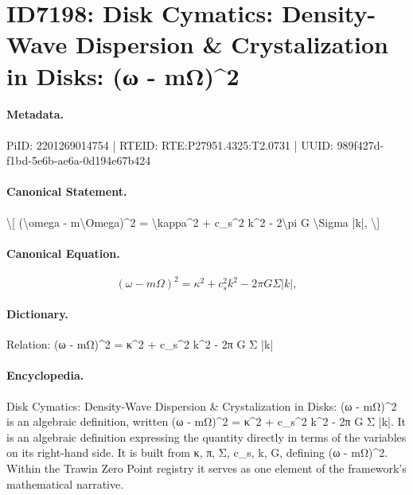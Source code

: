 \section*{ID7198: Disk Cymatics: Density-Wave Dispersion \& Crystalization in Disks: (ω - mΩ)\textasciicircum{}2}
\paragraph{Metadata.}
PiID: 2201269014754 | RTEID: RTE:P27951.4325:T2.0731 | UUID: 989f427d-f1bd-5e6b-ae6a-0d194e67b424

\paragraph{Canonical Statement.}
\textbackslash{}[ (\textbackslash{}omega - m\textbackslash{}Omega)\textasciicircum{}2 = \textbackslash{}kappa\textasciicircum{}2 + c\_s\textasciicircum{}2 k\textasciicircum{}2 - 2\textbackslash{}pi G \textbackslash{}Sigma |k|, \textbackslash{}]

\paragraph{Canonical Equation.}
\[
(\omega - m\Omega)^2 = \kappa^2 + c_s^2 k^2 - 2\pi G \Sigma |k|,
\]

\paragraph{Dictionary.}
Relation: (ω - mΩ)\textasciicircum{}2 = κ\textasciicircum{}2 + c\_s\textasciicircum{}2 k\textasciicircum{}2 - 2π G Σ |k|

\paragraph{Encyclopedia.}
Disk Cymatics: Density-Wave Dispersion \& Crystalization in Disks: (ω - mΩ)\textasciicircum{}2 is an algebraic definition, written (ω - mΩ)\textasciicircum{}2 = κ\textasciicircum{}2 + c\_s\textasciicircum{}2 k\textasciicircum{}2 - 2π G Σ |k|. It is an algebraic definition expressing the quantity directly in terms of the variables on its right-hand side. It is built from κ, π, Σ, c\_s, k, G, defining (ω - mΩ)\textasciicircum{}2. Within the Trawin Zero Point registry it serves as one element of the framework's mathematical narrative.
